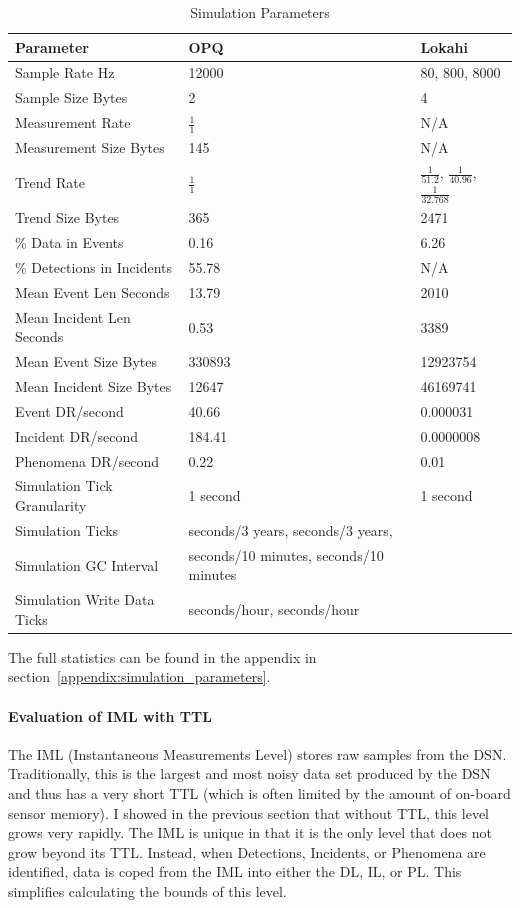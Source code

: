 \begin{table}[H]
	\centering
	\caption{Simulation Parameters}
	\begin{tabularx}{\textwidth}{Xll}
		\toprule
		\textbf{Parameter} & \textbf{OPQ} & \textbf{Lokahi} \\
		\midrule
		Sample Rate Hz & 12000 & 80, 800, 8000 \\
		Sample Size Bytes & 2 & 4 \\
		Measurement Rate & $\frac{1}{1}$ & N/A \\
		Measurement Size Bytes & 145 & N/A \\
		Trend Rate & $\frac{1}{1}$ & $\frac{1}{51.2}$, $\frac{1}{40.96}$, $\frac{1}{32.768}$ \\
		Trend Size Bytes & 365 & 2471 \\
		\% Data in Events & 0.16 & 6.26 \\
		\% Detections in Incidents & 55.78 & N/A \\
		Mean Event Len Seconds & 13.79 & 2010 \\
		Mean Incident Len Seconds & 0.53 & 3389 \\
		Mean Event Size Bytes & 330893 & 12923754 \\
		Mean Incident Size Bytes & 12647 & 46169741 \\
		Event DR/second & 40.66 &  0.000031 \\
		Incident DR/second & 184.41 &  0.0000008 \\
		Phenomena DR/second & 0.22 & 0.01 \\
		Simulation Tick Granularity & 1 second & 1 second \\
		Simulation Ticks & seconds/3 years, seconds/3 years, \\
		Simulation GC Interval & seconds/10 minutes, seconds/10 minutes \\
		Simulation Write Data Ticks & seconds/hour, seconds/hour \\
		\bottomrule
	\end{tabularx}
	\label{table:sim_params}
\end{table}

The full statistics can be found in the appendix in section~\ref{appendix:simulation_parameters}.

\paragraph{Evaluation of IML with TTL}
The IML (Instantaneous Measurements Level) stores raw samples from the DSN. Traditionally, this is the largest and most noisy data set produced by the DSN and thus has a very short TTL (which is often limited by the amount of on-board sensor memory). I showed in the previous section that without TTL, this level grows very rapidly. The IML is unique in that it is the only level that does not grow beyond its TTL. Instead, when Detections, Incidents, or Phenomena are identified, data is coped from the IML into either the DL, IL, or PL. This simplifies calculating the bounds of this level.


